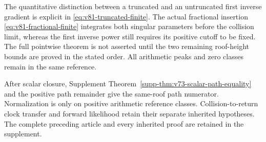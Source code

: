 \documentclass[11pt,reqno]{amsart}
\numberwithin{equation}{section}
\theoremstyle{definition}
\theoremstyle{remark}\newtheorem{remark}[theorem]{Remark}
\begin{document}
The quantitative distinction between a truncated and an untruncated
first inverse gradient is explicit in
\eqref{eq:v81-truncated-finite}. The actual fractional insertion
\eqref{eq:v81-fractional-finite} integrates both singular parameters
before the collision limit, whereas the first inverse power still
requires its positive cutoff to be fixed. The full pointwise theorem
is not asserted until the two remaining roof-height bounds are
proved in the stated order. All arithmetic peaks and zero classes
remain in the same reference.

After scalar closure, Supplement
Theorem~\ref{supp-thm:v73-scalar-path-equality} and the positive path
remainder give the same-roof path numerator. Normalization is only
on positive arithmetic reference classes. Collision-to-return clock
transfer and forward likelihood retain their separate inherited
hypotheses. The complete preceding article and every inherited proof
are retained in the supplement.


\end{document}
